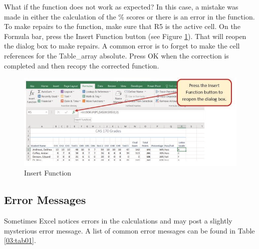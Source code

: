 What if the  function does not work as expected? In this case, a mistake was made in either the calculation of the \% scores or there is an error in the  function. To make repairs to the function, make sure that \textsf{R5} is the active cell. On the Formula bar, press the Insert Function button (see Figure \ref{03:fig15}). That will reopen the dialog box to make repairs. A common error is to forget to make the cell references for the Table\_array absolute. Press OK when the correction is completed and then recopy the corrected function.

\begin{figure}[H]
	\centering
	\includegraphics[width=\maxwidth{.95\linewidth}]{gfx/ch03_fig15}
	\caption{Insert Function}
	\label{03:fig15}
\end{figure}

\subsection{Error Messages}

Sometimes Excel notices errors in the calculations and may post a slightly mysterious error message. A list of common error messages can be found in Table \ref{03:tab01}.

